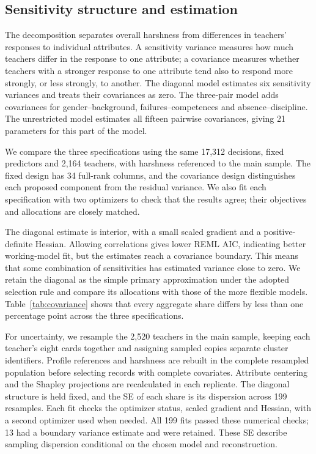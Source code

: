 \subsection{Sensitivity structure and estimation}
The decomposition separates overall harshness from differences in teachers' responses to individual attributes. A sensitivity variance measures how much teachers differ in the response to one attribute; a covariance measures whether teachers with a stronger response to one attribute tend also to respond more strongly, or less strongly, to another. The diagonal model estimates six sensitivity variances and treats their covariances as zero. The three-pair model adds covariances for gender--background, failures--competences and absence--discipline. The unrestricted model estimates all fifteen pairwise covariances, giving 21 parameters for this part of the model.

We compare the three specifications using the same 17,312 decisions, fixed predictors and 2,164 teachers, with harshness referenced to the main sample. The fixed design has 34 full-rank columns, and the covariance design distinguishes each proposed component from the residual variance. We also fit each specification with two optimizers to check that the results agree; their objectives and allocations are closely matched.

The diagonal estimate is interior, with a small scaled gradient and a positive-definite Hessian. Allowing correlations gives lower REML AIC, indicating better working-model fit, but the estimates reach a covariance boundary. This means that some combination of sensitivities has estimated variance close to zero. We retain the diagonal as the simple primary approximation under the adopted selection rule and compare its allocations with those of the more flexible models. Table~\ref{tab:covariance} shows that every aggregate share differs by less than one percentage point across the three specifications.

For uncertainty, we resample the 2,520 teachers in the main sample, keeping each teacher's eight cards together and assigning sampled copies separate cluster identifiers. Profile references and harshness are rebuilt in the complete resampled population before selecting records with complete covariates. Attribute centering and the Shapley projections are recalculated in each replicate. The diagonal structure is held fixed, and the SE of each share is its dispersion across 199 resamples. Each fit checks the optimizer status, scaled gradient and Hessian, with a second optimizer used when needed. All 199 fits passed these numerical checks; 13 had a boundary variance estimate and were retained. These SE describe sampling dispersion conditional on the chosen model and reconstruction.

